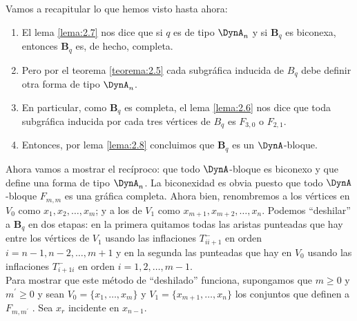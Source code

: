 Vamos a recapitular lo que hemos visto hasta ahora:\\
\begin{enumerate}
\item El lema \ref{lema:2.7} nos dice que si $q$ es de tipo $\DynA_{n}$ y si $\textbf{B}_{q}$ es biconexa, entonces $\textbf{B}_{q}$ es, de hecho, completa.
\item Pero por el teorema \ref{teorema:2.5} cada subgráfica inducida de $B_{q}$ debe definir otra forma de tipo $\DynA_{n}$.
\item En particular, como $\textbf{B}_{q}$ es completa, el lema \ref{lema:2.6} nos dice que toda subgráfica inducida por cada tres vértices de $B_{q}$ es $F_{3,0}$ o $F_{2,1}$.
\item Entonces, por lema \ref{lema:2.8} concluimos que $\textbf{B}_{q}$ es un $\DynA$-bloque.
\end{enumerate}

Ahora vamos a mostrar el recíproco: que todo $\DynA$-bloque es biconexo y que define una forma de tipo $\DynA_{n}$. La biconexidad es obvia puesto que todo $\DynA$-bloque $F_{m, m}$ es una gráfica completa. Ahora bien, renombremos a los vértices en $V_{0}$ como $x_{1}, x_{2}, \ldots, x_{m}$; y a los de $V_{1}$ como $x_{m+1}, x_{m+2}, \ldots, x_{n}$. Podemos “deshilar” a $\textbf{B}_{q}$ en dos etapas: en la primera quitamos todas las aristas punteadas que hay entre los vértices de $V_{1}$ usando las inflaciones $T_{i i+1}^{-}$ en orden $i = n-1, n-2, \ldots, m+1$ y en la segunda las punteadas que hay en $V_{0}$ usando las inflaciones $T_{i+1 i}^{-}$ en orden $i = 1, 2, \dots, m-1$.\\

Para mostrar que este método de “deshilado” funciona, supongamos que $m \ge 0$ y $m^{'} \ge 0$ y sean $V_{0} = \{x_{1}, \ldots, x_{m}\}$ y $V_{1} = \{x_{m+1}, \ldots, x_{n}\}$ los conjuntos que definen a $F_{m,m^{'}}$ . Sea $x_{r}$ incidente en $x_{n-1}$.

